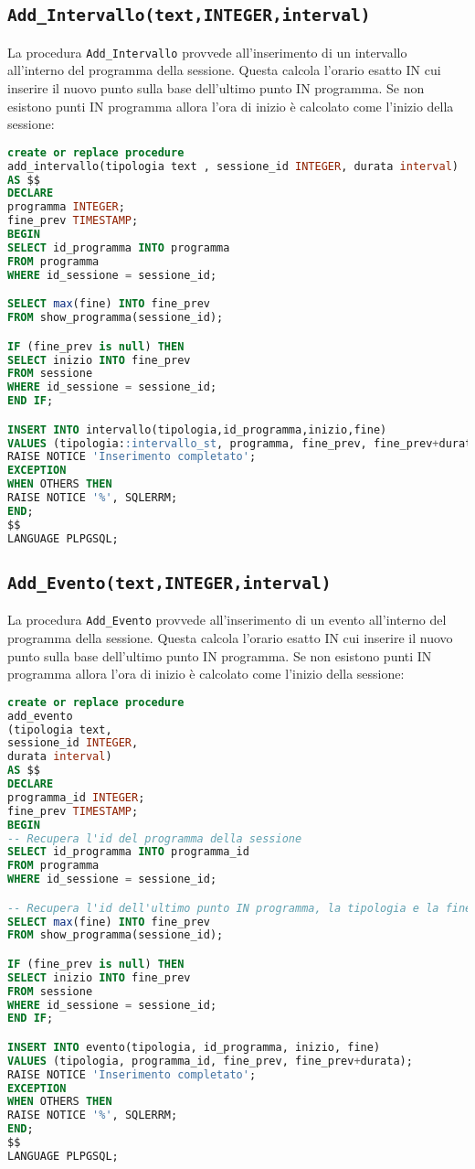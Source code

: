 \subsection{\texttt{Add\_Intervallo(text,INTEGER,interval)}}
La procedura \texttt{Add\_Intervallo} provvede all'inserimento di un intervallo all'interno del programma della sessione. Questa calcola l'orario esatto IN cui inserire il nuovo punto sulla base dell'ultimo punto IN programma. Se non esistono punti IN programma allora l'ora di inizio è calcolato come l'inizio della sessione:
\begin{lstlisting}[language=SQL,style=mystyle]
create or replace procedure 
add_intervallo(tipologia text , sessione_id INTEGER, durata interval)
AS $$
DECLARE
programma INTEGER;
fine_prev TIMESTAMP;
BEGIN
SELECT id_programma INTO programma
FROM programma
WHERE id_sessione = sessione_id;

SELECT max(fine) INTO fine_prev
FROM show_programma(sessione_id);

IF (fine_prev is null) THEN
SELECT inizio INTO fine_prev
FROM sessione
WHERE id_sessione = sessione_id;
END IF;

INSERT INTO intervallo(tipologia,id_programma,inizio,fine)
VALUES (tipologia::intervallo_st, programma, fine_prev, fine_prev+durata);
RAISE NOTICE 'Inserimento completato';
EXCEPTION
WHEN OTHERS THEN
RAISE NOTICE '%', SQLERRM;
END;
$$ 
LANGUAGE PLPGSQL;
\end{lstlisting}
\subsection{\texttt{Add\_Evento(text,INTEGER,interval)}}
La procedura \texttt{Add\_Evento} provvede all'inserimento di un evento all'interno del programma della sessione. Questa calcola l'orario esatto IN cui inserire il nuovo punto sulla base dell'ultimo punto IN programma. Se non esistono punti IN programma allora l'ora di inizio è calcolato come l'inizio della sessione:
\begin{lstlisting}[language=SQL,style=mystyle]
create or replace procedure 
add_evento
(tipologia text, 
sessione_id INTEGER, 
durata interval)
AS $$
DECLARE
programma_id INTEGER;
fine_prev TIMESTAMP;
BEGIN
-- Recupera l'id del programma della sessione
SELECT id_programma INTO programma_id
FROM programma
WHERE id_sessione = sessione_id;

-- Recupera l'id dell'ultimo punto IN programma, la tipologia e la fine
SELECT max(fine) INTO fine_prev
FROM show_programma(sessione_id);

IF (fine_prev is null) THEN
SELECT inizio INTO fine_prev
FROM sessione
WHERE id_sessione = sessione_id;
END IF;

INSERT INTO evento(tipologia, id_programma, inizio, fine)
VALUES (tipologia, programma_id, fine_prev, fine_prev+durata);
RAISE NOTICE 'Inserimento completato';
EXCEPTION
WHEN OTHERS THEN
RAISE NOTICE '%', SQLERRM;
END;
$$
LANGUAGE PLPGSQL;
\end{lstlisting}
